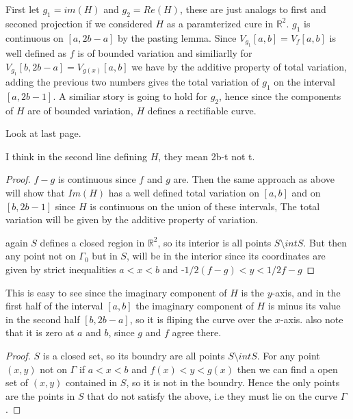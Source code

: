 \documentclass[11pt,largemargins]{homework}
\begin{document}
	\begin{alphaparts} 

		\questionpart 
		First let $g_1 = im(H)$ and $g_2 = Re(H)$, these are just analogs to first and seconed projection if we considered $H$ as a paramterized cure in $\mathbb{R}^2$. $g_1$ is continuous on $[a, 2b-a]$ by the pasting lemma. Since $V_{g_1} [a, b]  = V_{f} [a, b]$ is well defined as $f$ is of bounded variation and similiarlly for $V_{g_1}[b, 2b-a] = V_{g(x)} [a, b]$ we have by the additive property of total variation, adding the previous two numbers gives the total variation of $g_1$ on the interval $[a, 2b-1]$. A similiar story is going to hold for $g_2$, hence since the components of $H$ are of bounded variation, $H$ defines a rectifiable curve.
	
\questionpart

Look at last page.  

\questionpart
I think in the second line defining $H$, they mean 2b-t not t.

\begin{proof} 
$f-g$ is continuous since $f$ and $g$ are. Then the same approach as above will show that $Im(H)$ has a well defined total variation on $[a, b]$ and on $[b, 2b -1]$ since $H$ is continuous on the union of these intervals, The total variation will be given by the additive property of variation. 

again $S$ defines a closed region in $\mathbb{R}^2$, so its interior is all points $S \setminus intS$. But then any point not on $\Gamma_0$ but in $S$, 
will be in the interior since its coordinates are given by strict inequalities $a < x < b$ and -$1/2 (f - g) < y < 1/2 f-g$
\end{proof}
\questionpart 
This is easy to see since the imaginary component of $H$ is the $y$-axis, and in the first half of the interval $[a, b]$ the imaginary component of $H$ 
is minus its value in the second half $[b, 2b-a]$, so it is fliping the curve over the $x$-axis. also note that it is zero at $a$ and $b$, since $g$ and $f$ 
agree there. 

\questionpart 
\begin{proof} 
	$S$ is a closed set, so its boundry are all points $S \setminus intS$. For any point $(x, y)$ not on $\Gamma$ if $a < x < b$ and $f(x) < y < g(x)$ then we can find a open set of $(x, y)$ contained in $S$, so it is not in the boundry. Hence the only points are the points in $S$ that do not satisfy the above, i.e they must lie on the curve $\Gamma$.
\end{proof}


\end{alphaparts}
\end{document}
